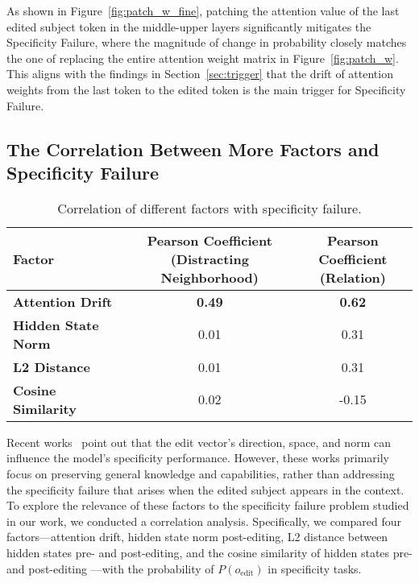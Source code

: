 As shown in Figure~\ref{fig:patch_w_fine}, patching the attention value of the last edited subject token in the middle-upper layers significantly mitigates the Specificity Failure, where the magnitude of change in probability closely matches the one of replacing the entire attention weight matrix in Figure~\ref{fig:patch_w}.
This aligns with the findings in Section~\ref{sec:trigger} that the drift of attention weights from the last token to the edited token is the main trigger for Specificity Failure.

\subsection{The Correlation Between More Factors and Specificity Failure}

\begin{wraptable}{R}{0.5\textwidth}  
    \centering
    \caption{Correlation of different factors with specificity failure.}
    \label{tab:correlation_factors_table}
    \begin{adjustbox}{width=0.5\textwidth}  
    \begin{tabular}{lcc}
    \toprule
    \textbf{Factor} & \makecell{\textbf{Pearson Coefficient} \\ \textbf{(Distracting Neighborhood)}} & \makecell{\textbf{Pearson Coefficient} \\ \textbf{(Relation)}} \\
    \midrule
    \textbf{Attention Drift}         & \textbf{0.49} & \textbf{0.62} \\
    \textbf{Hidden State Norm}       & 0.01          & 0.31          \\
    \textbf{L2 Distance} & 0.01          & 0.31          \\
    \textbf{Cosine Similarity} & 0.02 & -0.15         \\
    \bottomrule
    \end{tabular}
    \end{adjustbox}
\end{wraptable}

Recent works~\citep{fang2024alphaedit,yao2024knowledge,ma2405perturbation} point out that the edit vector's direction, space, and norm can influence the model's specificity performance. However, these works primarily focus on preserving general knowledge and capabilities, rather than addressing the specificity failure that arises when the edited subject appears in the context. To explore the relevance of these factors to the specificity failure problem studied in our work, we conducted a correlation analysis. Specifically, we compared four factors—attention drift, hidden state norm post-editing, L2 distance between hidden states pre- and post-editing, and the cosine similarity of hidden states pre- and post-editing —with the probability of $P(o_{\text{edit}})$ in specificity tasks.

